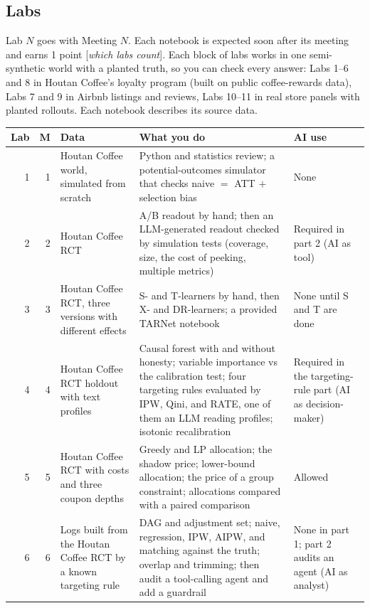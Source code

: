 \documentclass[11pt]{article}
\newcommand{\tbd}[1]{\textcolor{warnred}{[\emph{#1}]}}
\begin{document}
\subsection*{Labs}

Lab $N$ goes with Meeting $N$. Each notebook is expected soon after its meeting and earns 1 point
\tbd{which labs count}. Each block of labs works in one semi-synthetic world with a planted truth, so you can check every
answer: Labs 1--6 and 8 in Houtan Coffee's loyalty program (built on public coffee-rewards data), Labs 7 and 9 in Airbnb
listings and reviews, Labs 10--11 in real store panels with planted rollouts. Each notebook describes its source data.

\begin{center}
\footnotesize
\begin{tabular}{rrL{3.6cm}L{4.4cm}L{3.4cm}}
\toprule
\textbf{Lab} & \textbf{M} & \textbf{Data} & \textbf{What you do} & \textbf{AI use} \\
 & 1 & Houtan Coffee world, simulated from scratch & Python and statistics review; a potential-outcomes simulator that checks naive $=$ ATT $+$ selection bias & None \\
2 & 2 & Houtan Coffee RCT & A/B readout by hand; then an LLM-generated readout checked by simulation tests (coverage, size, the cost of peeking, multiple metrics) & Required in part 2 (AI as tool) \\
3 & 3 & Houtan Coffee RCT, three versions with different effects & S- and T-learners by hand, then X- and DR-learners; a provided TARNet notebook & None until S and T are done \\
4 & 4 & Houtan Coffee RCT holdout with text profiles & Causal forest with and without honesty; variable importance vs the calibration test; four targeting rules evaluated by IPW, Qini, and RATE, one of them an LLM reading profiles; isotonic recalibration & Required in the targeting-rule part (AI as decision-maker) \\
5 & 5 & Houtan Coffee RCT with costs and three coupon depths & Greedy and LP allocation; the shadow price; lower-bound allocation; the price of a group constraint; allocations compared with a paired comparison & Allowed \\
6 & 6 & Logs built from the Houtan Coffee RCT by a known targeting rule & DAG and adjustment set; naive, regression, IPW, AIPW, and matching against the truth; overlap and trimming; then audit a tool-calling agent and add a guardrail & None in part 1; part 2 audits an agent (AI as analyst) \\

\end{tabular}
\end{center}
\end{document}
